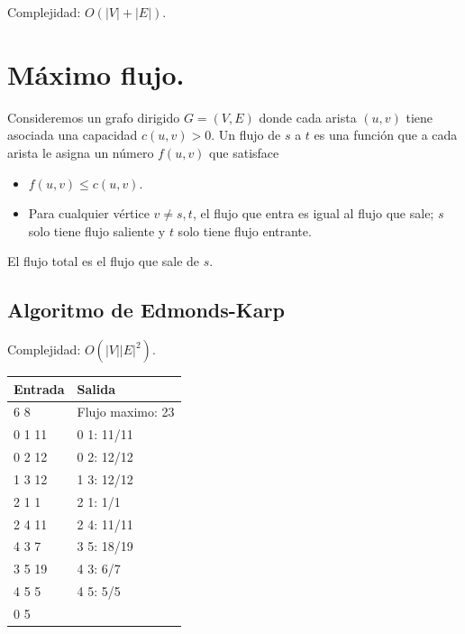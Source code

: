 \documentclass[12pt, letterpaper, twoside]{article}
\begin{document}
Complejidad: $O(|V| + |E|)$.

 \medskip

%
%

\newpage

\section{Máximo flujo.}

Consideremos un grafo dirigido $G = (V, E)$ donde cada arista $(u, v)$ tiene asociada una capacidad $c(u,v) > 0$. Un flujo de $s$ a $t$ es una función que a cada arista le asigna un número $f(u,v)$ que satisface
\begin{itemize}
\item $f(u, v) \leq c(u,v)$.
\item Para cualquier vértice $v \neq s, t$, el flujo que entra es igual al flujo que sale; $s$ solo tiene flujo saliente y $t$ solo tiene flujo entrante.
\end{itemize}
El flujo total es el flujo que sale de $s$.

\subsection{Algoritmo de Edmonds-Karp}

Complejidad: $O(|V||E|^2)$.

 \medskip

\begin{tabular}{|p{7cm}|p{7cm}|}
\hline
\textbf{Entrada} & \textbf{Salida}\\ \hline
6 8 & Flujo maximo: 23\\
0 1 11 & 0 1: 11/11\\
0 2 12 & 0 2: 12/12\\
1 3 12 & 1 3: 12/12\\
2 1 1  & 2 1: 1/1\\
2 4 11 & 2 4: 11/11\\
4 3 7  & 3 5: 18/19\\
3 5 19 & 4 3: 6/7\\
4 5 5 & 4 5: 5/5\\ 
0 5 & \\ \hline
\end{tabular}
\end{document}
